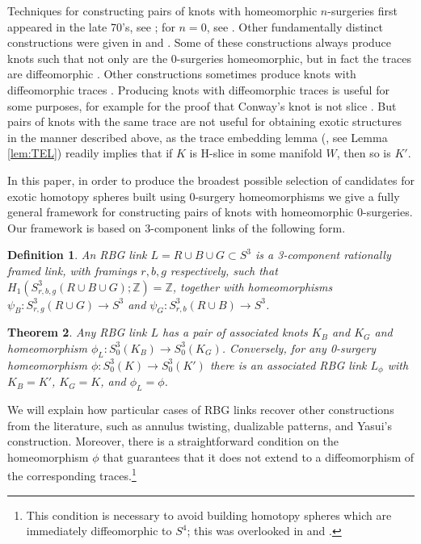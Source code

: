 \documentclass [11pt]{amsart}
\newtheorem {theorem}{Theorem}[section]
\newtheorem {definition}[theorem]{Definition}
\theoremstyle{remark}
\begin{document}
Techniques for constructing pairs of knots with homeomorphic $n$-surgeries first appeared in the late 70's, see \cite{Lickorish1, Akb2Dhom, Lickorish2}; for $n=0$, see  \cite{Brakes}. Other fundamentally distinct constructions were given in \cite{Osoinach} and \cite{Yasui}. Some of these constructions always produce knots such that not only are the 0-surgeries homeomorphic, but in fact the traces are diffeomorphic \cite{Akb2Dhom, Lickorish2, Brakes}. Other constructions sometimes produce knots with diffeomorphic traces \cite{AJOT}. Producing knots with diffeomorphic traces is useful for some purposes, for example for the proof that Conway's knot is not slice \cite{Pic2}. But pairs of knots with the same trace are not useful for obtaining exotic structures in the manner described above, as the trace embedding lemma (\cite{FoxMilnor}, see Lemma \ref{lem:TEL}) readily implies that if $K$ is H-slice in some manifold $W$, then so is $K'$. 



In this paper, in order to produce the broadest possible selection of candidates for exotic homotopy spheres built using 0-surgery homeomorphisms we give a fully general framework for constructing pairs of knots with homeomorphic $0$-surgeries. Our framework is based on $3$-component links of the following form. 

\begin{definition} 
\label{def:RBG}
An \emph{RBG link} $L=R\cup B\cup G \subset S^3$ is a 3-component rationally framed link, with framings  $r, b, g$ respectively, such that $H_1(S^3_{r,b,g}(R\cup B\cup G);\mathbb{Z})=\mathbb{Z}$, together with homeomorphisms $\psi_B:S^3_{r,g}(R\cup G)\to S^3$ and $\psi_G:S^3_{r,b}(R\cup B)\to S^3$.
\end{definition}

\begin{theorem}
\label{thm:RBG}
Any RBG link $L$ has a pair of associated knots $K_B$ and $K_G$ and homeomorphism $\phi_L:S^3_0(K_B)\to S^3_0(K_G)$. Conversely, for any 0-surgery homeomorphism $\phi:S^3_0(K)\to S^3_0(K')$ there is an associated RBG link $L_\phi$ with $K_B=K'$, $K_G=K$, and $\phi_L = \phi$. 
\end{theorem}

We will explain how particular cases of RBG links recover other constructions from the literature, such as annulus twisting, dualizable patterns, and Yasui's construction. Moreover, there is a straightforward condition on the homeomorphism $\phi$ that guarantees that it does not extend to a {diffeomorphism} of the corresponding traces.\footnote{This condition is necessary to avoid building homotopy spheres which are immediately diffeomorphic to $S^4$; this was overlooked in  \cite{AJOT} and \cite{AbeTange}.}
\end{document}
